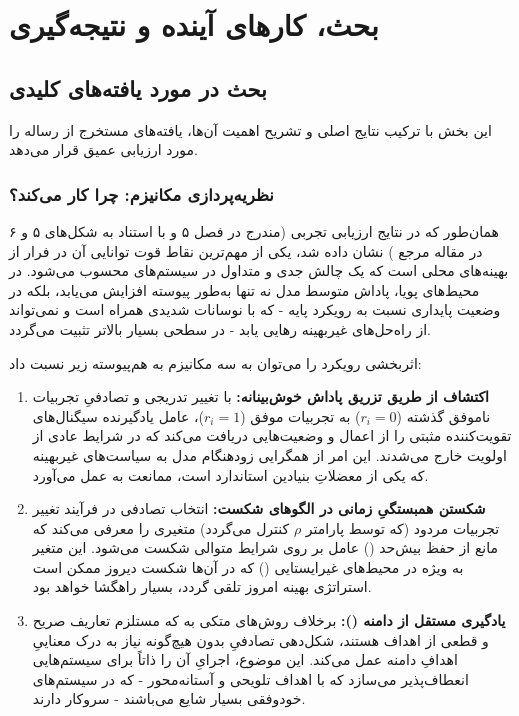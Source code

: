 \documentclass[oneside,openany,phd]{TMU-Thesis}
\begin{document}
\newpage

\chapter{بحث، کارهای آینده و نتیجه‌گیری}

\section{بحث در مورد یافته‌های کلیدی}

این بخش با ترکیب نتایج اصلی و تشریح اهمیت آن‌ها، یافته‌های مستخرج از رساله را مورد ارزیابی عمیق قرار می‌دهد.

\subsection{نظریه‌پردازی مکانیزم: چرا  کار می‌کند؟}

همان‌طور که در نتایج ارزیابی تجربی (مندرج در فصل ۵ و با استناد به شکل‌های ۵ و ۶ در مقاله مرجع \cite{RS_DRL_Article}) نشان داده شد، یکی از مهم‌ترین نقاط قوت  توانایی آن در فرار از بهینه‌های محلی است که یک چالش جدی و متداول در سیستم‌های  محسوب می‌شود. در محیط‌های پویا، پاداش متوسط مدل  نه تنها به‌طور پیوسته افزایش می‌یابد، بلکه در وضعیت پایداری نسبت به رویکرد پایه  - که با نوسانات شدیدی همراه است و نمی‌تواند از راه‌حل‌های غیربهینه رهایی یابد - در سطحی بسیار بالاتر تثبیت می‌گردد.

اثربخشی رویکرد  را می‌توان به سه مکانیزم به هم‌پیوسته زیر نسبت داد:

\begin{enumerate}
    \item \textbf{اکتشاف از طریق تزریق پاداش خوش‌بینانه:} با تغییر تدریجی و تصادفیِ تجربیات ناموفق گذشته ($r_i=0$) به تجربیات موفق ($r_i=1$)، عامل یادگیرنده سیگنال‌های تقویت‌کننده مثبتی را از اعمال و وضعیت‌هایی دریافت می‌کند که در شرایط عادی از اولویت خارج می‌شدند. این امر از همگرایی زودهنگام مدل به سیاست‌های غیربهینه که یکی از معضلاتِ بنیادین  استاندارد است، ممانعت به عمل می‌آورد.
    \item \textbf{شکستن همبستگیِ زمانی در الگوهای شکست:} انتخاب تصادفی در فرآیند تغییر تجربیات مردود (که توسط پارامتر $\rho$ کنترل می‌گردد) متغیری را معرفی می‌کند که مانع از حفظ بیش‌حد () عامل بر روی شرایط متوالی شکست می‌شود. این متغیر به ویژه در محیط‌های غیرایستایی () که در آن‌ها شکست دیروز ممکن است استراتژی بهینه امروز تلقی گردد، بسیار راهگشا خواهد بود.
    \item \textbf{یادگیری مستقل از دامنه ():} برخلاف روش‌های متکی به  که مستلزم تعاریف صریح و قطعی از اهداف هستند، شکل‌دهی تصادفیِ  بدون هیچ‌گونه نیاز به درک معناییِ اهدافِ دامنه عمل می‌کند. این موضوع، اجرایِ آن را ذاتاً برای سیستم‌هایی انعطاف‌پذیر می‌سازد که با اهداف تلویحی و آستانه‌محور - که در سیستم‌های خودوفقی بسیار شایع می‌باشند - سروکار دارند.
\end{enumerate}
\end{document}
